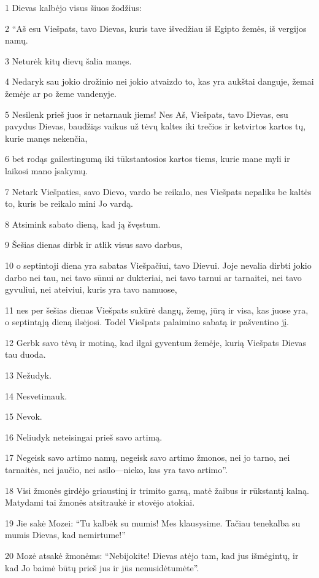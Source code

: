\par 1 Dievas kalbėjo visus šiuos žodžius: 
\par 2 “Aš esu Viešpats, tavo Dievas, kuris tave išvedžiau iš Egipto žemės, iš vergijos namų. 
\par 3 Neturėk kitų dievų šalia manęs. 
\par 4 Nedaryk sau jokio drožinio nei jokio atvaizdo to, kas yra aukštai danguje, žemai žemėje ar po žeme vandenyje. 
\par 5 Nesilenk prieš juos ir netarnauk jiems! Nes Aš, Viešpats, tavo Dievas, esu pavydus Dievas, baudžiąs vaikus už tėvų kaltes iki trečios ir ketvirtos kartos tų, kurie manęs nekenčia, 
\par 6 bet rodąs gailestingumą iki tūkstantosios kartos tiems, kurie mane myli ir laikosi mano įsakymų. 
\par 7 Netark Viešpaties, savo Dievo, vardo be reikalo, nes Viešpats nepaliks be kaltės to, kuris be reikalo mini Jo vardą. 
\par 8 Atsimink sabato dieną, kad ją švęstum. 
\par 9 Šešias dienas dirbk ir atlik visus savo darbus, 
\par 10 o septintoji diena yra sabatas Viešpačiui, tavo Dievui. Joje nevalia dirbti jokio darbo nei tau, nei tavo sūnui ar dukteriai, nei tavo tarnui ar tarnaitei, nei tavo gyvuliui, nei ateiviui, kuris yra tavo namuose, 
\par 11 nes per šešias dienas Viešpats sukūrė dangų, žemę, jūrą ir visa, kas juose yra, o septintąją dieną ilsėjosi. Todėl Viešpats palaimino sabatą ir pašventino jį. 
\par 12 Gerbk savo tėvą ir motiną, kad ilgai gyventum žemėje, kurią Viešpats Dievas tau duoda. 
\par 13 Nežudyk. 
\par 14 Nesvetimauk. 
\par 15 Nevok. 
\par 16 Neliudyk neteisingai prieš savo artimą. 
\par 17 Negeisk savo artimo namų, negeisk savo artimo žmonos, nei jo tarno, nei tarnaitės, nei jaučio, nei asilo—nieko, kas yra tavo artimo”. 
\par 18 Visi žmonės girdėjo griaustinį ir trimito garsą, matė žaibus ir rūkstantį kalną. Matydami tai žmonės atsitraukė ir stovėjo atokiai. 
\par 19 Jie sakė Mozei: “Tu kalbėk su mumis! Mes klausysime. Tačiau tenekalba su mumis Dievas, kad nemirtume!” 
\par 20 Mozė atsakė žmonėms: “Nebijokite! Dievas atėjo tam, kad jus išmėgintų, ir kad Jo baimė būtų prieš jus ir jūs nenusidėtumėte”. 
